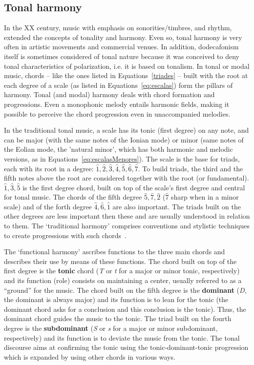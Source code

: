 \documentclass[format=acmsmall, review=false, screen=true]{acmart}
\begin{document}
\subsection{Tonal harmony}
In the XX century, music with emphasis on sonorities/timbres, and rhythm, extended the concepts of tonality and harmony. Even so, tonal harmony is very often in artistic movements and commercial venues. In addition, dodecafonism itself is sometimes considered of tonal nature because it was conceived to deny tonal characteristics of polarization, i.e. it is based on tonalism.
In tonal or modal music, chords -- like the ones listed in
Equations~\ref{triades} -- built with the root at each degree of a scale (as listed in Equations~\ref{eq:escalas}) form the pillars of harmony.
Tonal (and modal) harmony deals with chord formation and progressions.
Even a monophonic melody entails harmonic fields, making it possible to perceive the chord progression even in unaccompanied melodies.

In the traditional tonal music, a scale has its tonic (first
degree) on any note, and can be major (with the same notes of the Ionian mode) or minor (same notes of the Eolian mode, the 'natural minor', which has both harmonic and melodic versions, as in Equations~\ref{eq:escalasMenores}). The
scale is the base for triads, each with its root in a degree: $\hat{1},\hat{2},\hat{3},\hat{4},\hat{5},\hat{6},\hat{7}$.
To build triads, the third and the fifth notes above the root are considered together with the root (or fundamental).
$\hat{1},\hat{3},\hat{5}$ is the first degree chord,
 built on top of the scale's first degree and central for tonal music. The chords of the fifth degree $\hat{5},\hat{7},\hat{2}$ ($\hat{7}$ sharp when in a minor scale) and of the forth degree $\hat{4},\hat{6},\hat{1}$ are also important.
 The triads built on the other degrees are less important then these and are usually understood in relation to them. The `traditional harmony' comprises conventions and stylistic techniques to create progressions with such chords~\cite{Harmonia}. 

The `functional harmony' ascribes functions to the three main chords and describes their use by means of these functions. The chord built on top of the first degree is the \textbf{tonic} chord (\textit{T} or \textit{t} for a major or minor tonic, respectively) and its function (role) consists on maintaining a center, usually referred to as a ``ground'' for the music. The chord built on the fifth degree is the \textbf{dominant} (\textit{D}, the dominant is always major) and its function is to lean for the tonic
(the dominant chord asks for a conclusion and this conclusion is the tonic). Thus, the dominant chord guides the music to the tonic. The triad built on the fourth degree is the \textbf{subdominant} (\textit{S} or \textit{s} for a major or minor
subdominant, respectively) and its function is to deviate the music from the tonic.
The tonal discourse aims at confirming the tonic using the tonic-dominant-tonic progression
which is expanded by using other chords in various ways.
\end{document}

